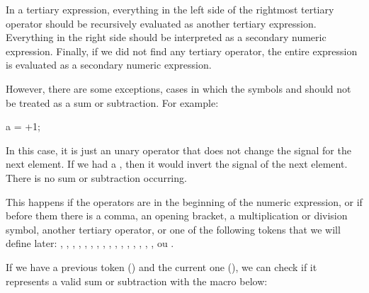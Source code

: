 In a tertiary expression, everything in the left side of the rightmost
tertiary operator should be recursively evaluated as another tertiary
expression. Everything in the right side should be interpreted as a
secondary numeric expression. Finally, if we did not find any tertiary
operator, the entire expression is evaluated as a secondary numeric
expression.

However, there are some exceptions, cases in which the
symbols \monoespaco{+} and \monoespaco{-} should not be treated as a
sum or subtraction. For example:

\alinhaverbatim
a = +1;
\alinhanormal

In this case, it is just an unary operator that does not change the
signal for the next element. If we had a \monoespaco{-}, then it would
invert the signal of the next element. There is no sum or subtraction
occurring.

This happens if the operators are in the beginning of the numeric
expression, or if before them there is a comma, an opening bracket, a
multiplication or division symbol, another tertiary operator, or one
of the following tokens that we will define later:
, , ,
, , ,
,  , ,
, , ,
, , , ,
 ou .

If we have a previous token () and the current one
(), we can check if it represents a valid sum or
subtraction with the macro below:

